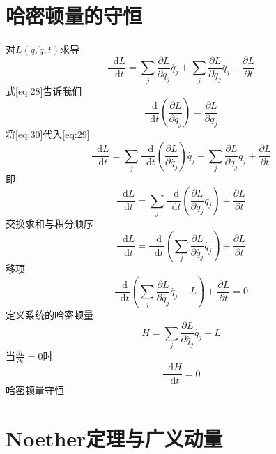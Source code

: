 \documentclass{article}
\newcommand*{\dif}{\mathop{}\!\mathrm{d}}
\begin{document}
\section{哈密顿量的守恒}

对$L \left( q, \dot{q} ,t \right)$求导
\begin{equation}
  \label{eq:29}
  \frac{\dif L}{\dif t} = \sum\limits_{j} \frac{\partial L}{\partial q_{j}} \dot{q_{j}} + \sum\limits_{j} \frac{\partial L}{\partial \dot{q}_{j}} \ddot{q_{j}} + \frac{\partial L}{\partial t}
\end{equation}
式\ref{eq:28}告诉我们
\begin{equation}
  \label{eq:30}
  \frac{\dif}{\dif t} \left( \frac{\partial L}{\partial \dot{q_{j}}} \right) = \frac{\partial L}{\partial q_{j}}
\end{equation}
将\ref{eq:30}代入\ref{eq:29}
\begin{equation}
  \label{eq:31}
  \frac{\dif L}{\dif t} = \sum\limits_{j}\frac{\dif}{\dif t} \left( \frac{\partial L}{\partial \dot{q_{j}}} \right)  \dot{q_{j}} + \sum\limits_{j} \frac{\partial L}{\partial \dot{q}_{j}} \ddot{q_{j}} + \frac{\partial L}{\partial t}
\end{equation}
即
\begin{equation}
  \label{eq:32}
  \frac{\dif L}{\dif t} = \sum\limits_{j}\frac{\dif}{\dif t} \left( \frac{\partial L}{\partial \dot{q_{j}}} \dot{q_{j}} \right) + \frac{\partial L}{\partial t}
\end{equation}
交换求和与积分顺序
\begin{equation}
  \label{eq:33}
  \frac{\dif L}{\dif t} = \frac{\dif}{\dif t} \left( \sum\limits_{j}  \frac{\partial L}{\partial \dot{q_{j}}} \dot{q_{j}} \right) + \frac{\partial L}{\partial t}
\end{equation}
移项
\begin{equation}
  \label{eq:34}
  \frac{\dif}{\dif t} \left( \sum\limits_{j} \frac{\partial L}{\partial \dot{q_{j}}} \dot{q_{j}} -L \right) + \frac{\partial L}{\partial t} = 0
\end{equation}
定义系统的哈密顿量
\begin{equation}
  \label{eq:35}
  H = \sum\limits_{j} \frac{\partial L}{\partial \dot{q_{j}}} \dot{q_{j}} -L 
\end{equation}
当$\frac{\partial L}{\partial t}=0$时
\begin{equation}
  \label{eq:36}
  \frac{\dif H}{\dif t} = 0
\end{equation}
哈密顿量守恒

\section{Noether定理与广义动量}
\end{document}
